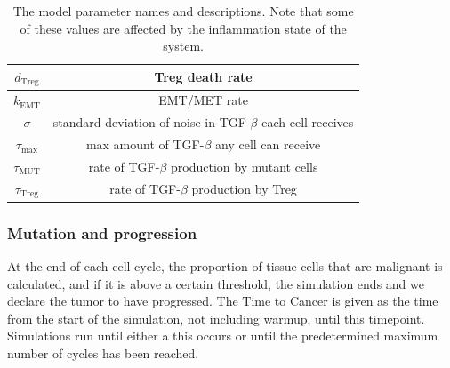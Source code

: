 \documentclass[11pt]{article}
\begin{document}
\begin{table}[H]
\begin{center}
\begin{tabular}{|| c | c ||}
  \hline
  $d_\text{Treg}$ & Treg death rate \\ 
  \hline
  $k_\text{EMT}$ & EMT/MET rate  \\
  \hline
  $\sigma$ & standard deviation of noise in TGF-$\beta$ each cell receives  \\
  \hline
 $\tau_\text{max}$ & max amount of TGF-$\beta$ any cell can receive \\
  \hline 
 $\tau_\text{MUT}$ & rate of TGF-$\beta$ production by mutant cells\\
  \hline
 $\tau_\text{Treg}$ & rate of TGF-$\beta$ production by Treg\\
  \hline
\end{tabular}
  \caption{The model parameter names and descriptions. Note that some of these values are affected by the inflammation state of the system.}
\end{center}
\end{table}

\subsubsection{Mutation and progression}
At the end of each cell cycle, the proportion of tissue cells that are malignant is calculated, and if it is above a certain threshold, the simulation ends and we declare the tumor to have progressed.
The Time to Cancer is given as the time from the start of the simulation, not including warmup, until this timepoint.
Simulations run until either a this occurs or until the predetermined maximum number of cycles has been reached.
\end{document}
